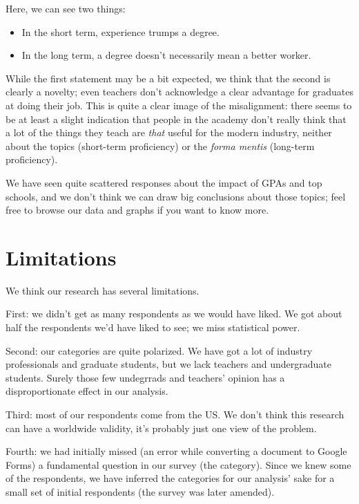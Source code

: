 \documentclass{sigchi}
\begin{document}
Here, we can see two things:
\begin{itemize}
\item In the short term, experience trumps a degree.
\item In the long term, a degree doesn't necessarily mean a better worker.	
\end{itemize}

While the first statement may be a bit expected, we think that the second is clearly a novelty; even teachers don't acknowledge a clear advantage for graduates at doing their job. This is quite a clear image of the misalignment: there seems to be at least a slight indication that people in the academy don't really think that a lot of the things they teach are \textit{that} useful for the modern industry, neither about the topics (short-term proficiency) or the \textit{forma mentis} (long-term proficiency).

We have seen quite scattered responses about the impact of GPAs and top schools, and we don't think we can draw big conclusions about those topics; feel free to browse our data and graphs if you want to know more.

\section{Limitations}
 We think our research has several limitations.\newline

First: we didn't get as many respondents as we would have liked. We got about half the respondents we'd have liked to see; we miss statistical power.\newline

Second: our categories are quite polarized. We have got a lot of industry professionals and graduate students, but we lack teachers and undergraduate students. Surely those few undegrrads and teachers' opinion has a disproportionate effect in our analysis. \newline

Third: most of our respondents come from the US. We don't think this research can have a worldwide validity, it's probably just one view of the problem.\newline

Fourth: we had initially missed (an error while converting a document to Google Forms) a fundamental question in our survey (the category). Since we knew some of the respondents, we have inferred the categories for our analysis' sake for a small set of initial respondents (the survey was later amended).\newline
\end{document}
